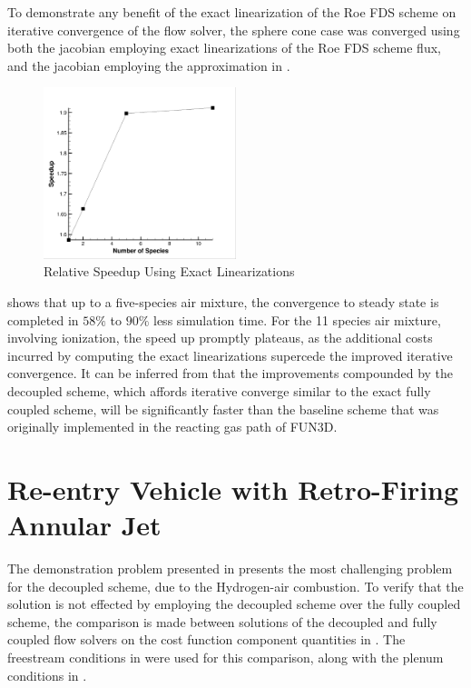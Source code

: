 To demonstrate any benefit of the exact linearization of the Roe FDS scheme on
iterative convergence of the flow solver, the sphere cone case was converged
using both the jacobian employing exact linearizations of the Roe FDS scheme
flux, and the jacobian employing the approximation in .
\begin{figure}[h]
  \centering
  \includegraphics[width=0.5\textwidth]{figures/flow-efficiency/exact-approx-speedup.png}
  \caption{Relative Speedup Using Exact Linearizations}
  \label{fig:exact-approx-speedup}
\end{figure}
 shows that up to a five-species air mixture, the
convergence to steady state is completed in $58\%$ to $90\%$ less simulation
time.  For the 11 species air mixture, involving ionization, the speed up
promptly plateaus, as the additional costs incurred by computing the exact
linearizations supercede the improved iterative convergence.  It can be inferred
from  that the improvements compounded by the
decoupled scheme, which affords iterative converge similar to the exact fully
coupled scheme, will be significantly faster than the baseline scheme that was
originally implemented in the reacting gas path of FUN3D.

\section{Re-entry Vehicle with Retro-Firing Annular Jet}

The demonstration problem presented in 
presents the most challenging problem for the decoupled scheme, due to the
Hydrogen-air combustion.  To verify that the solution is not effected by
employing the decoupled scheme over the fully coupled scheme, the comparison is
made between solutions of the decoupled and fully coupled flow solvers on the
cost function component quantities in .  The
freestream conditions in  were used for this
comparison, along with the plenum conditions in .

